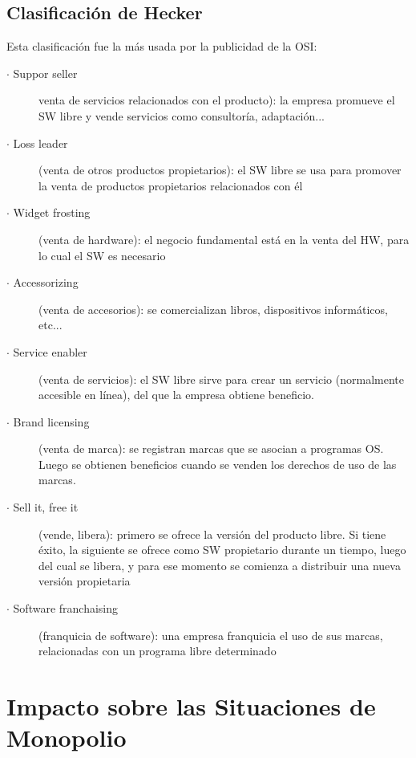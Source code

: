 \subsection{Clasificación de Hecker}

Esta clasificación fue la más usada por la publicidad de la OSI:

\begin{description}
	\item[$\cdot$ Suppor seller] venta de servicios relacionados con el producto): la empresa promueve el SW libre y vende servicios como consultoría, adaptación...
	
	\item[$\cdot$ Loss leader] (venta de otros productos propietarios): el SW libre se usa para promover la venta de productos propietarios relacionados con él

	\item[$\cdot$ Widget frosting ] (venta de hardware): el negocio fundamental está en la venta del HW, para lo cual el SW es necesario

	\item[$\cdot$ Accessorizing] (venta de accesorios): se comercializan libros, dispositivos informáticos, etc...

	\item[$\cdot$ Service enabler ] (venta de servicios): el SW libre sirve para crear un servicio (normalmente accesible en línea), del que la empresa obtiene beneficio.

	\item[$\cdot$ Brand licensing] (venta de marca): se registran marcas que se asocian a programas OS. Luego se obtienen beneficios cuando se venden los derechos de uso de las marcas.

	\item[$\cdot$ Sell it, free it ] (vende, libera): primero se ofrece la versión del producto libre. Si tiene éxito, la siguiente se ofrece como SW propietario durante un tiempo, luego del cual se libera, y para ese momento se comienza a distribuir una nueva versión propietaria

	\item[$\cdot$ Software franchaising] (franquicia de software): una empresa franquicia el uso de sus marcas, relacionadas con un programa libre determinado

\end{description}


\section{Impacto sobre las Situaciones de Monopolio}



